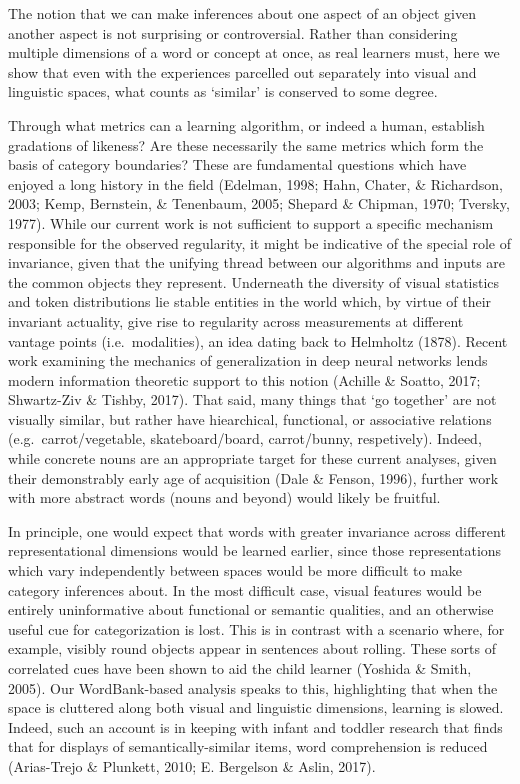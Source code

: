 \documentclass[10pt, letterpaper]{article}
\begin{document}
The notion that we can make inferences about one aspect of an object
given another aspect is not surprising or controversial. Rather than
considering multiple dimensions of a word or concept at once, as real
learners must, here we show that even with the experiences parcelled out
separately into visual and linguistic spaces, what counts as `similar'
is conserved to some degree.

Through what metrics can a learning algorithm, or indeed a human,
establish gradations of likeness? Are these necessarily the same metrics
which form the basis of category boundaries? These are fundamental
questions which have enjoyed a long history in the field (Edelman, 1998;
Hahn, Chater, \& Richardson, 2003; Kemp, Bernstein, \& Tenenbaum, 2005;
Shepard \& Chipman, 1970; Tversky, 1977). While our current work is not
sufficient to support a specific mechanism responsible for the observed
regularity, it might be indicative of the special role of invariance,
given that the unifying thread between our algorithms and inputs are the
common objects they represent. Underneath the diversity of visual
statistics and token distributions lie stable entities in the world
which, by virtue of their invariant actuality, give rise to regularity
across measurements at different vantage points (i.e.~modalities), an
idea dating back to Helmholtz (1878). Recent work examining the
mechanics of generalization in deep neural networks lends modern
information theoretic support to this notion (Achille \& Soatto, 2017;
Shwartz-Ziv \& Tishby, 2017). That said, many things that `go together'
are not visually similar, but rather have hiearchical, functional, or
associative relations (e.g.~carrot/vegetable, skateboard/board,
carrot/bunny, respetively). Indeed, while concrete nouns are an
appropriate target for these current analyses, given their demonstrably
early age of acquisition (Dale \& Fenson, 1996), further work with more
abstract words (nouns and beyond) would likely be fruitful.

In principle, one would expect that words with greater invariance across
different representational dimensions would be learned earlier, since
those representations which vary independently between spaces would be
more difficult to make category inferences about. In the most difficult
case, visual features would be entirely uninformative about functional
or semantic qualities, and an otherwise useful cue for categorization is
lost. This is in contrast with a scenario where, for example, visibly
round objects appear in sentences about rolling. These sorts of
correlated cues have been shown to aid the child learner (Yoshida \&
Smith, 2005). Our WordBank-based analysis speaks to this, highlighting
that when the space is cluttered along both visual and linguistic
dimensions, learning is slowed. Indeed, such an account is in keeping
with infant and toddler research that finds that for displays of
semantically-similar items, word comprehension is reduced (Arias-Trejo
\& Plunkett, 2010; E. Bergelson \& Aslin, 2017).
\end{document}
